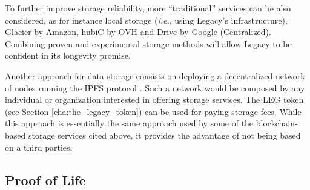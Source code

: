 To further improve storage reliability, more ``traditional'' services can be also considered, as for instance local storage (\textit{i.e.}, using Legacy's infrastructure), Glacier by Amazon, hubiC by OVH and Drive by Google (Centralized).
Combining proven and experimental storage methods will allow Legacy to be confident in its longevity promise.

Another approach for data storage consists on deploying a decentralized network of nodes running the IPFS protocol \cite{Benet}. Such a network would be composed by any individual or organization interested in offering storage services. The LEG token (see Section \ref{cha:the_legacy_token}) can be used for paying storage fees.
While this approach is essentially the same approach used by some of the blockchain-based storage services cited above, it provides the advantage of not being based on a third parties.


\subsection{Proof of Life} %
\label{sub:proof_of_life}

